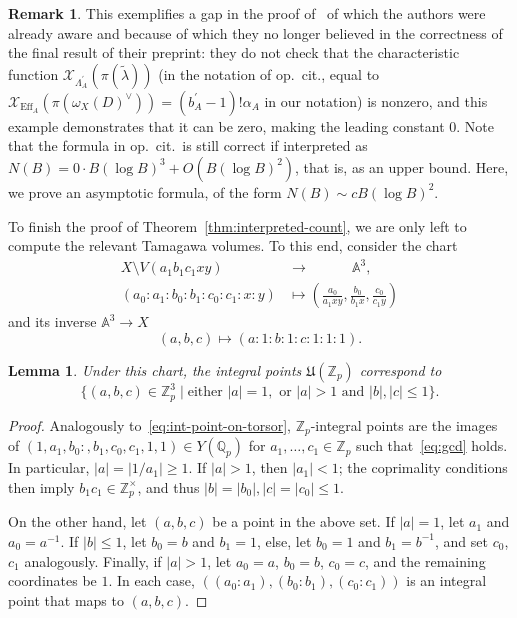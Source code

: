 \documentclass[a4paper, twoside, 10pt]{amsart}
\newcommand{\charfun}{\mathcal{X}}
\newcommand{\mU}{\mathfrak{U}}
\newcommand{\bAA}{\mathbb{A}}
\newcommand{\ZZ}{\mathbb{Z}}
\newcommand{\QQ}{\mathbb{Q}}
\DeclareMathOperator{\Eff}{Eff}
\newcommand{\abs}[1]{\left\lvert#1\right\rvert}
\newtheorem{lemma}[theorem]{Lemma}
\theoremstyle{definition}
\newtheorem{remark}[theorem]{Remark}
\begin{document}
\begin{remark}\label{rmk:gap}
  This exemplifies a gap in the proof of~\cite[Lem.~3.11.4]{arXiv:1006.3345} of which the authors were already aware and because of which they no longer believed in the correctness of the final result of their preprint: they do not check that the characteristic function $\mathscr{X}_{\Lambda^\prime_A}(\pi(\tilde{\lambda}))$ (in the notation of op.~cit., equal to $\charfun_{\Eff_A}(\pi (\omega_X(D)^\vee)) = (b^\prime_A-1)! \alpha_A$ in our notation) is nonzero, and this example demonstrates that it can be zero, making the leading constant 0. Note that the formula in op.~cit.\ is still correct if interpreted as $N(B)=0 \cdot B(\log B)^3+O(B(\log B)^{2})$, that is, as an upper bound. Here, we prove an asymptotic formula, of the form $N(B) \sim c B(\log B)^{2}$.
\end{remark}

To finish the proof of Theorem~\ref{thm:interpreted-count}, we are only left to compute the relevant Tamagawa volumes. To this end, consider the chart
\begin{align*}
  X \setminus V(a_1b_1c_1xy) \quad & \to \quad \qquad \bAA^3,\\
  (a_0:a_1:b_0:b_1:c_0:c_1:x:y) & \mapsto \left(\frac{a_0}{a_1xy},\frac{b_0}{b_1x},\frac{c_0}{c_1y}\right)
\end{align*}
and its inverse $\bAA^3\to X$
\[
  (a,b,c)\mapsto (a:1:b:1:c:1:1:1).
\]

\begin{lemma}
  Under this chart, the integral points $\mU(\ZZ_p)$ correspond to
  \[
    \{(a,b,c)\in\ZZ_p^3 \mid \text{either }\abs{a}= 1, \text{ or } \abs{a}>1 \text{ and } \abs{b},\abs{c} \le 1\}\text{.}
  \]
\end{lemma}
\begin{proof}
  Analogously to~\eqref{eq:int-point-on-torsor}, $\ZZ_p$-integral points are the images of $(1,a_1,b_0:,b_1,c_0,c_1,1,1)\in Y(\QQ_p)$  for $a_1,\dots,c_1\in\ZZ_p$ such that~\eqref{eq:gcd} holds.
  In particular, $|a|=|1/a_1| \ge 1$. If $|a|> 1$, then $|a_1|<1$;
  the coprimality conditions then imply $b_1c_1\in\ZZ_p^\times$, and thus $|b|=|b_0|,|c|=|c_0| \le 1$.

  On the other hand, let $(a,b,c)$ be a point in the above set. If $|a|=1$, let $a_1$ and $a_0=a^{-1}$. If $|b|\le 1$, let $b_0=b$ and $b_1=1$, else, let $b_0=1$ and $b_1=b^{-1}$, and set $c_0$, $c_1$ analogously. 
  Finally, if $|a|>1$, let $a_0=a$, $b_0=b$, $c_0=c$, and the remaining coordinates be $1$. In each case, $((a_0:a_1),(b_0:b_1),(c_0:c_1))$ is an integral point that maps to $(a,b,c)$.
\end{proof}
\end{document}
